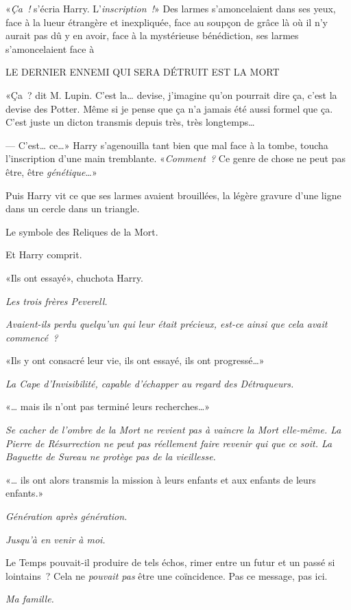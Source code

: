 «\emph{Ça~!} s'écria Harry. L'\emph{inscription~!}» Des larmes s'amoncelaient dans ses yeux, face à la lueur étrangère et inexpliquée, face au soupçon de grâce là où il n'y aurait pas dû y en avoir, face à la mystérieuse bénédiction, ses larmes s'amoncelaient face à
\begin{center}
LE DERNIER ENNEMI QUI SERA DÉTRUIT EST LA MORT
\end{center}

«Ça~? dit M. Lupin. C'est la… devise, j'imagine qu'on pourrait dire ça, c'est la devise des Potter. Même si je pense que ça n'a jamais été aussi formel que ça. C'est juste un dicton transmis depuis très, très longtemps…

--- C'est… ce…» Harry s'agenouilla tant bien que mal face à la tombe, toucha l'inscription d'une main tremblante. «\emph{Comment~?} Ce genre de chose ne peut pas être, être \emph{génétique}…»

Puis Harry vit ce que ses larmes avaient brouillées, la légère gravure d'une ligne dans un cercle dans un triangle.

Le symbole des Reliques de la Mort.

Et Harry comprit.

«Ils ont essayé», chuchota Harry.

\emph{Les trois frères Peverell.}

\emph{Avaient-ils perdu quelqu'un qui leur était précieux, est-ce ainsi que cela avait commencé~?}

«Ils y ont consacré leur vie, ils ont essayé, ils ont progressé…»

\emph{La Cape d'Invisibilité, capable d'échapper au regard des Détraqueurs.}

«… mais ils n'ont pas terminé leurs recherches…»

\emph{Se cacher de l'ombre de la Mort ne revient pas à vaincre la Mort elle-même. La Pierre de Résurrection ne peut pas réellement faire revenir qui que ce soit. La Baguette de Sureau ne protège pas de la vieillesse.}

«… ils ont alors transmis la mission à leurs enfants et aux enfants de leurs enfants.»

\emph{Génération après génération.}

\emph{Jusqu'à en venir à moi.}

Le Temps pouvait-il produire de tels échos, rimer entre un futur et un passé si lointains~? Cela ne \emph{pouvait pas} être une coïncidence. Pas ce message, pas ici.

\emph{Ma famille.}

